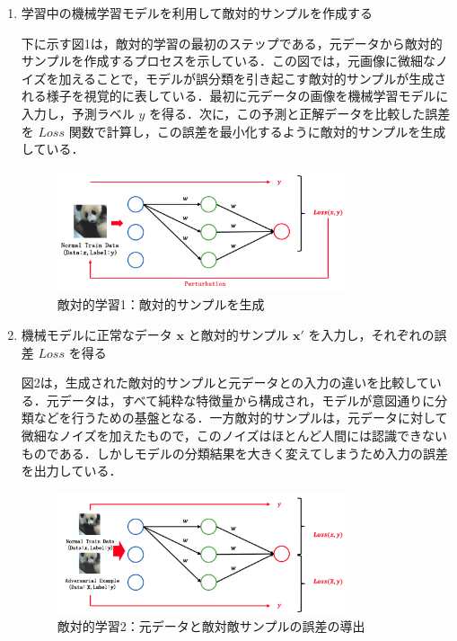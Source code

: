 \begin{enumerate}

    \item 学習中の機械学習モデルを利用して敵対的サンプルを作成する

    下に示す図1は，敵対的学習の最初のステップである，元データから敵対的サンプルを作成するプロセスを示している．この図では，元画像に微細なノイズを加えることで，モデルが誤分類を引き起こす敵対的サンプルが生成される様子を視覚的に表している．最初に元データの画像を機械学習モデルに入力し，予測ラベル $y$ を得る．次に，この予測と正解データを比較した誤差を $Loss$ 関数で計算し，この誤差を最小化するように敵対的サンプルを生成している．
    
    \begin{figure}[H]
        \centering
        \includegraphics[width=0.8\textwidth]{images/敵対的学習1.png}
        \caption{敵対的学習1：敵対的サンプルを生成}
        \label{fig:adversarial_learning1}
    \end{figure}
    
    \item 機械モデルに正常なデータ $\bm{x}$ と敵対的サンプル $\bm{x}'$ を入力し，それぞれの誤差 $Loss$ を得る

    図2は，生成された敵対的サンプルと元データとの入力の違いを比較している．元データは，すべて純粋な特徴量から構成され，モデルが意図通りに分類などを行うための基盤となる．一方敵対的サンプルは，元データに対して微細なノイズを加えたもので，このノイズはほとんど人間には認識できないものである．しかしモデルの分類結果を大きく変えてしまうため入力の誤差を出力している．

    \begin{figure}[H]
        \centering
        \includegraphics[width=0.8\textwidth]{images/敵対的学習2.png}
        \caption{敵対的学習2：元データと敵対敵サンプルの誤差の導出}
        \label{fig:adversarial_learning2}
    \end{figure}


\end{enumerate}
